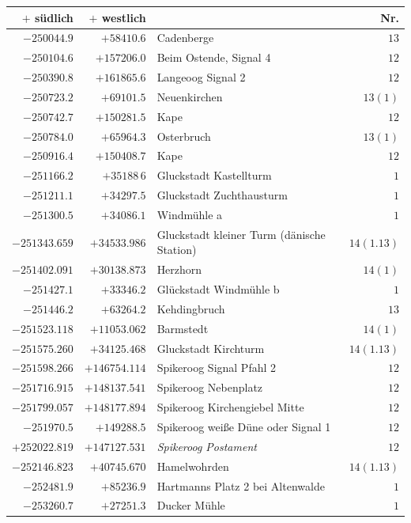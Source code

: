 \begin{center}\begingroup\fontsize{8}{9}\selectfont
\setlength{\tabcolsep}{4pt}
\begin{tabular}{r|r|p{170pt}|r}\hline
\(+\) südlich&\(+\) westlich&&Nr.\\\hline
\(-250044.9\)&\(+58410.6\)&Cadenberge&\(13\)\\
\(-250104.6\)&\(+157206.0\)&Beim Ostende, Signal 4&\(12\)\\
\(-250390.8\)&\(+161865.6\)&Langeoog Signal 2&\(12\)\\
\(-250723.2\)&\(+69101.5\)&Neuenkirchen&\(13(1)\)\\
\(-250742.7\)&\(+150281.5\)&Kape&\(12\)\\
\(-250784.0\)&\(+65964.3\)&Osterbruch&\(13(1)\)\\
\(-250916.4\)&\(+150408.7\)&Kape&\(12\)\\
\(-251166.2\)&\(+35188\,6\)&Gluckstadt Kastellturm&\(1\)\\
\(-251211.1\)&\(+34297.5\)&Gluckstadt Zuchthausturm&\(1\)\\
\(-251300.5\)&\(+34086.1\)&Windmühle a&\(1\)\\
\(-251343.659\)&\(+34533.986\)&Gluckstadt kleiner Turm (dänische Station)&\(14(1.13)\)\\
\(-251402.091\)&\(+30138.873\)&Herzhorn&\(14(1)\)\\
\(-251427.1\)&\(+33346.2\)&Glückstadt Windmühle b&\(1\)\\
\(-251446.2\)&\(+63264.2\)&Kehdingbruch&\(13\)\\
\(-251523.118\)&\(+11053.062\)&Barmstedt&\(14(1)\)\\
\(-251575.260\)&\(+34125.468\)&Gluckstadt Kirchturm&\(14(1.13)\)\\
\(-251598.266\)&\(+146754.114\)&Spikeroog Signal Pfahl 2&\(12\)\\
\(-251716.915\)&\(+148137.541\)&Spikeroog Nebenplatz&\(12\)\\
\(-251799.057\)&\(+148177.894\)&Spikeroog Kirchengiebel Mitte&\(12\)\\
\(-251970.5\)&\(+149288.5\)&Spikeroog weiße Düne oder Signal 1&\(12\)\\
\(+252022.819\)&\(+147127.531\)&\textit{Spikeroog Postament}&\(12\)\\
\(-252146.823\)&\(+40745.670\)&Hamelwohrden&\(14(1.13)\)\\
\(-252481.9\)&\(+85236.9\)&Hartmanns Platz 2 bei Altenwalde&\(1\)\\
\(-253260.7\)&\(+27251.3\)&Ducker Mühle&\(1\)\\

\end{tabular}
\end{center}
